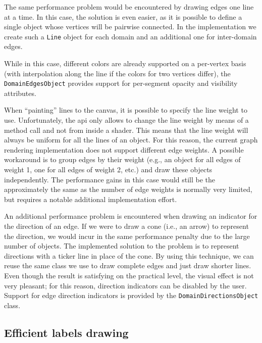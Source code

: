 The same performance problem would be encountered by drawing edges one line at a time. In this case, the solution is even easier, as it is possible to define a single object whose vertices will be pairwise connected. In the implementation we create such a \texttt{Line} object for each domain and an additional one for inter-domain edges.

While in this case, different colors are already supported on a per-vertex basis (with interpolation along the line if the colors for two vertices differ), the \texttt{DomainEdgesObject} provides support for per-segment opacity and visibility attributes.

When ``painting'' lines to the canvas, it is possible to specify the line weight to use. Unfortunately, the \gls{api} only allows to change the line weight by means of a method call and not from inside a shader. This means that the line weight will always be uniform for all the lines of an object. For this reason, the current graph rendering implementation does not support different edge weights. A possible workaround is to group edges by their weight (e.g., an object for all edges of weight 1, one for all edges of weight 2, etc.) and draw these objects independently. The performance gains in this case would still be the approximately the same as the number of edge weights is normally very limited, but requires a notable additional implementation effort.

An additional performance problem is encountered when drawing an indicator for the direction of an edge. If we were to draw a cone (i.e., an arrow) to represent the direction, we would incur in the same performance penalty due to the large number of objects. The implemented solution to the problem is to represent directions with a ticker line in place of the cone. By using this technique, we can reuse the same class we use to draw complete edges and just draw shorter lines. Even though the result is satisfying on the practical level, the visual effect is not very pleasant; for this reason, direction indicators can be disabled by the user. Support for edge direction indicators is provided by the \texttt{DomainDirectionsObject} class.

\subsection{Efficient labels drawing}

